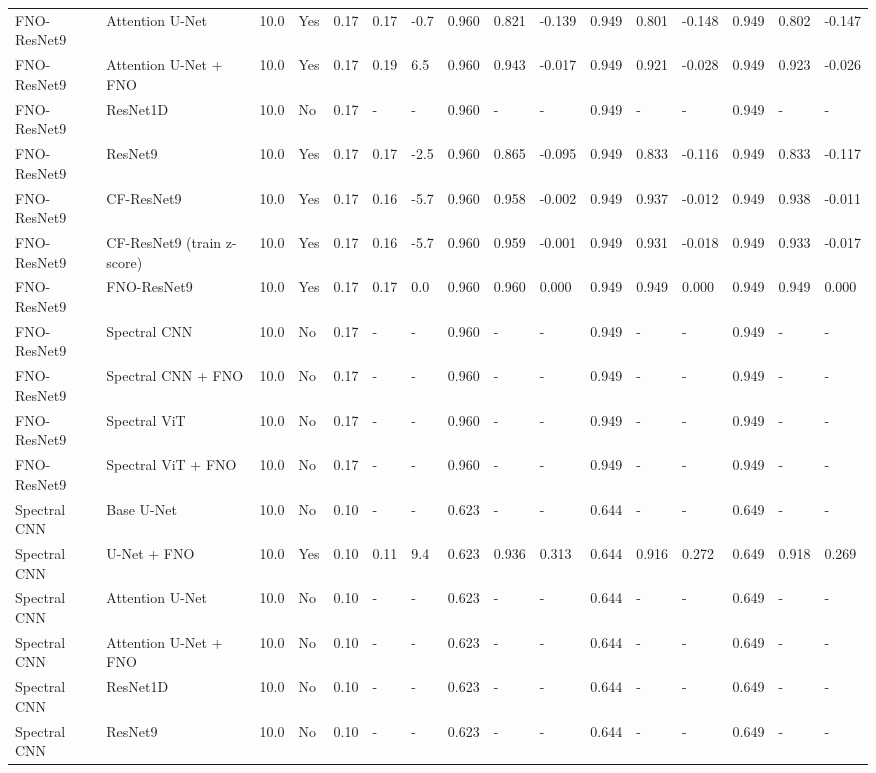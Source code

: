 \begin{longtable}{llllllllllllllll}
FNO-ResNet9 & Attention U-Net & 10.0 & Yes & 0.17 & 0.17 & -0.7 & 0.960 & 0.821 & -0.139 & 0.949 & 0.801 & -0.148 & 0.949 & 0.802 & -0.147 \\
FNO-ResNet9 & Attention U-Net + FNO & 10.0 & Yes & 0.17 & 0.19 & 6.5 & 0.960 & 0.943 & -0.017 & 0.949 & 0.921 & -0.028 & 0.949 & 0.923 & -0.026 \\
FNO-ResNet9 & ResNet1D & 10.0 & No & 0.17 & - & - & 0.960 & - & - & 0.949 & - & - & 0.949 & - & - \\
FNO-ResNet9 & ResNet9 & 10.0 & Yes & 0.17 & 0.17 & -2.5 & 0.960 & 0.865 & -0.095 & 0.949 & 0.833 & -0.116 & 0.949 & 0.833 & -0.117 \\
FNO-ResNet9 & CF-ResNet9 & 10.0 & Yes & 0.17 & 0.16 & -5.7 & 0.960 & 0.958 & -0.002 & 0.949 & 0.937 & -0.012 & 0.949 & 0.938 & -0.011 \\
FNO-ResNet9 & CF-ResNet9 (train z-score) & 10.0 & Yes & 0.17 & 0.16 & -5.7 & 0.960 & 0.959 & -0.001 & 0.949 & 0.931 & -0.018 & 0.949 & 0.933 & -0.017 \\
FNO-ResNet9 & FNO-ResNet9 & 10.0 & Yes & 0.17 & 0.17 & 0.0 & 0.960 & 0.960 & 0.000 & 0.949 & 0.949 & 0.000 & 0.949 & 0.949 & 0.000 \\
FNO-ResNet9 & Spectral CNN & 10.0 & No & 0.17 & - & - & 0.960 & - & - & 0.949 & - & - & 0.949 & - & - \\
FNO-ResNet9 & Spectral CNN + FNO & 10.0 & No & 0.17 & - & - & 0.960 & - & - & 0.949 & - & - & 0.949 & - & - \\
FNO-ResNet9 & Spectral ViT & 10.0 & No & 0.17 & - & - & 0.960 & - & - & 0.949 & - & - & 0.949 & - & - \\
FNO-ResNet9 & Spectral ViT + FNO & 10.0 & No & 0.17 & - & - & 0.960 & - & - & 0.949 & - & - & 0.949 & - & - \\
Spectral CNN & Base U-Net & 10.0 & No & 0.10 & - & - & 0.623 & - & - & 0.644 & - & - & 0.649 & - & - \\
Spectral CNN & U-Net + FNO & 10.0 & Yes & 0.10 & 0.11 & 9.4 & 0.623 & 0.936 & 0.313 & 0.644 & 0.916 & 0.272 & 0.649 & 0.918 & 0.269 \\
Spectral CNN & Attention U-Net & 10.0 & No & 0.10 & - & - & 0.623 & - & - & 0.644 & - & - & 0.649 & - & - \\
Spectral CNN & Attention U-Net + FNO & 10.0 & No & 0.10 & - & - & 0.623 & - & - & 0.644 & - & - & 0.649 & - & - \\
Spectral CNN & ResNet1D & 10.0 & No & 0.10 & - & - & 0.623 & - & - & 0.644 & - & - & 0.649 & - & - \\
Spectral CNN & ResNet9 & 10.0 & No & 0.10 & - & - & 0.623 & - & - & 0.644 & - & - & 0.649 & - & - \\

\end{longtable}
